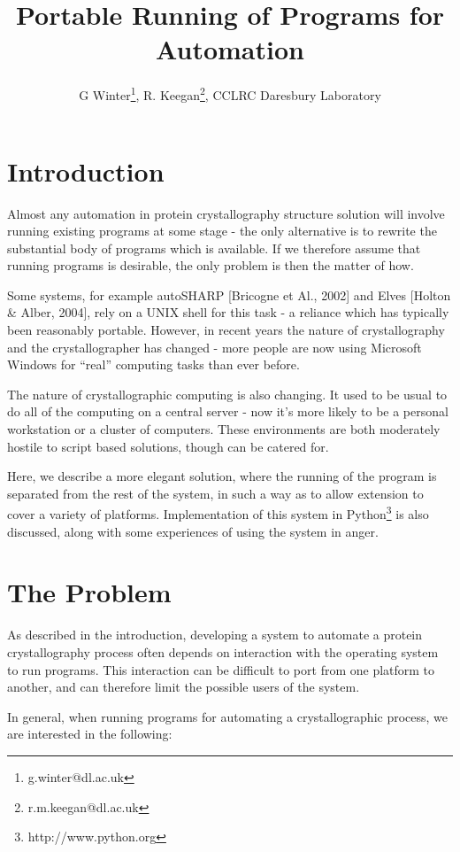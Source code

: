 \documentclass[a4paper, 11pt]{article}
\title{Portable Running of Programs for Automation}
\author{G Winter\footnote{g.winter@dl.ac.uk}, 
R. Keegan\footnote{r.m.keegan@dl.ac.uk}, 
CCLRC Daresbury Laboratory}
\begin{document}
\maketitle

\section{Introduction}

Almost any automation in protein crystallography structure solution will 
involve running existing programs at some stage - 
the only alternative is to rewrite 
the substantial body of programs which is available. If we therefore assume 
that running programs is desirable, the only problem is then the matter of 
how.

Some systems, for example autoSHARP [Bricogne et Al., 2002] and 
Elves [Holton \& Alber, 2004], rely on a UNIX shell for this
task - a reliance which has typically been reasonably portable. However, 
in recent years the nature of crystallography and the crystallographer 
has changed - more people are now using Microsoft Windows for ``real''
computing tasks than ever before.

The nature of crystallographic computing is also changing. It used to be 
usual to do all of the computing on a central server - now it's more likely
to be a personal workstation or a cluster of computers. These environments
are both moderately hostile to script based solutions, though can be catered
for.

Here, we describe a more elegant solution, where the running of the program is 
separated from the rest of the system, in such a way as to allow extension
to cover a variety of platforms. Implementation of this system in 
Python\footnote{http://www.python.org} is
also discussed, along with some experiences of using the system in anger.

\section{The Problem}

As described in the introduction, developing a system to automate a protein
crystallography process often depends on interaction with the operating 
system to run programs. This interaction can be difficult to port from 
one platform to another, and can therefore limit the possible users of the 
system.

In general, when running programs for automating a crystallographic process, 
we are interested in the following:
\end{document}
